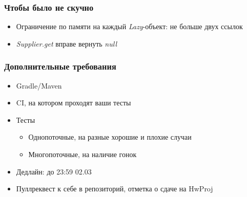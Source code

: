 \documentclass[xetex,mathserif,serif]{beamer}
\begin{document}
	\begin{frame}
		\frametitle{Чтобы было не скучно}
		\begin{itemize}
			\item Ограничение по памяти на каждый \textit{Lazy}-объект: не больше двух ссылок
			\item \textit{Supplier.get} вправе вернуть \textit{null}
		\end{itemize}
	\end{frame}

	\begin{frame}
		\frametitle{Дополнительные требования}
		\begin{itemize}
			\item Gradle/Maven
			\item CI, на котором проходят ваши тесты
			\item Тесты
			\begin{itemize}
				\item Однопоточные, на разные хорошие и плохие случаи
				\item Многопоточные, на наличие гонок
			\end{itemize}
			\item Дедлайн: до 23:59 02.03
			\item Пуллреквест к себе в репозиторий, отметка о сдаче на HwProj
		\end{itemize}
	\end{frame}
\end{document}
